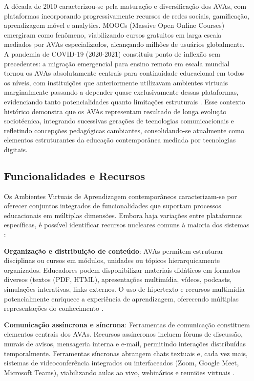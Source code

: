 \documentclass[portuguese]{sbc2025}%
\begin{document}
A década de 2010 caracterizou-se pela maturação e diversificação dos AVAs, com plataformas incorporando progressivamente recursos de redes sociais, gamificação, aprendizagem móvel e analytics. MOOCs (Massive Open Online Courses) emergiram como fenômeno, viabilizando cursos gratuitos em larga escala mediados por AVAs especializados, alcançando milhões de usuários globalmente. A pandemia de COVID-19 (2020-2021) constituiu ponto de inflexão sem precedentes: a migração emergencial para ensino remoto em escala mundial tornou os AVAs absolutamente centrais para continuidade educacional em todos os níveis, com instituições que anteriormente utilizavam ambientes virtuais marginalmente passando a depender quase exclusivamente dessas plataformas, evidenciando tanto potencialidades quanto limitações estruturais \cite{Hodges2020, Williamson2020}. Esse contexto histórico demonstra que os AVAs representam resultado de longa evolução sociotécnica, integrando sucessivas gerações de tecnologias comunicacionais e refletindo concepções pedagógicas cambiantes, consolidando-se atualmente como elementos estruturantes da educação contemporânea mediada por tecnologias digitais.

\subsection{Funcionalidades e Recursos}

Os Ambientes Virtuais de Aprendizagem contemporâneos caracterizam-se por oferecer conjuntos integrados de funcionalidades que suportam processos educacionais em múltiplas dimensões. Embora haja variações entre plataformas específicas, é possível identificar recursos nucleares comuns à maioria dos sistemas \cite{Pereira2007, Bates2015}:

\textbf{Organização e distribuição de conteúdo}: AVAs permitem estruturar disciplinas ou cursos em módulos, unidades ou tópicos hierarquicamente organizados. Educadores podem disponibilizar materiais didáticos em formatos diversos (textos (PDF, HTML), apresentações multimídia, vídeos, podcasts, simulações interativas, links externos. O uso de hipertexto e recursos multimídia potencialmente enriquece a experiência de aprendizagem, oferecendo múltiplas representações do conhecimento \cite{Bates2015}.

\textbf{Comunicação assíncrona e síncrona}: Ferramentas de comunicação constituem elementos centrais dos AVAs. Recursos assíncronos incluem fóruns de discussão, murais de avisos, mensageria interna e e-mail, permitindo interações distribuídas temporalmente. Ferramentas síncronas abrangem chats textuais e, cada vez mais, sistemas de videoconferência integrados ou interfaceados (Zoom, Google Meet, Microsoft Teams), viabilizando aulas ao vivo, webinários e reuniões virtuais \cite{Anderson2003}.
\end{document}
